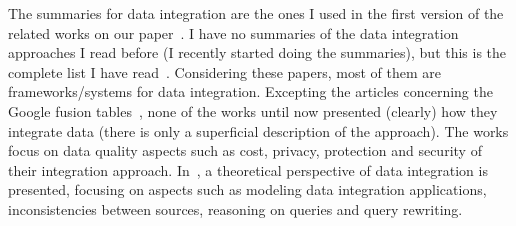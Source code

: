 \documentclass[12pt,a4paper,oneside]{article}
\begin{document}
The summaries for data integration are the ones I used in the first version of the related works on our paper~\cite{075,078,Nie07,096,Yau08}. I have no summaries of the data integration approaches I read before (I recently started doing the summaries), but this is the complete list I have read~\cite{066,067,070,072,113,077,Dustdar:2012,081,110,111,094,099,102}. Considering these papers, most of them are frameworks/systems for data integration. Excepting the articles concerning the Google fusion tables~\cite{Gonzalez:2010}, none of the works until now presented (clearly) how they integrate data (there is only a superficial description of the approach). The works focus on data quality aspects such as cost, privacy, protection and security of their integration approach. In~\cite{Lenzerini:2002}, a theoretical perspective of data integration is presented, focusing on aspects such as modeling data integration applications, inconsistencies between sources, reasoning on queries and query rewriting.



\end{document}
